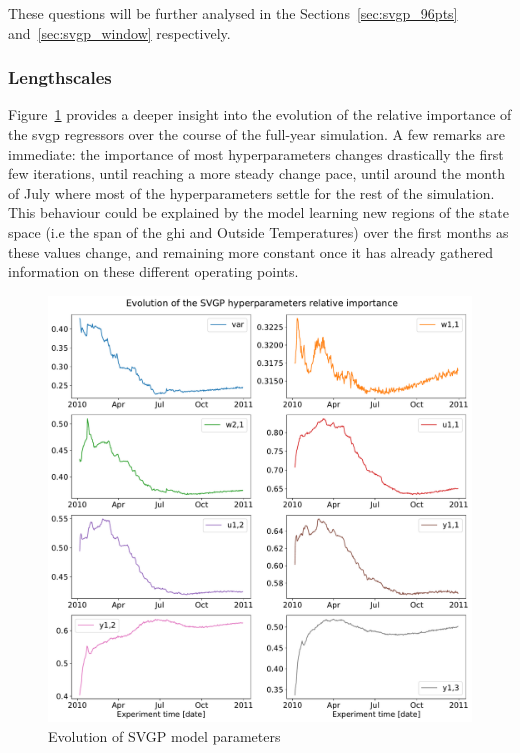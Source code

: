 These questions will be further analysed in the Sections~\ref{sec:svgp_96pts}
and~\ref{sec:svgp_window} respectively.

\clearpage

\subsubsection{Lengthscales}\label{sec:lengthscales_results}

Figure~\ref{fig:SVGP_evol_importance} provides a deeper insight into the
evolution of the relative importance of the \acrshort{svgp} regressors over the
course of the full-year simulation\footnotemark. A few remarks are immediate:
the importance of most hyperparameters changes drastically the first few
iterations, until reaching a more steady change pace, until around the month of
July where most of the hyperparameters settle for the rest of the simulation.
This behaviour could be explained by the model learning new regions of the state
space (i.e the span of the \acrshort{ghi} and Outside Temperatures) over the
first months as these values change, and remaining more constant once it has
already gathered information on these different operating points.


\begin{figure}[ht]
    \centering
    \includegraphics[width =
    \textwidth]{Plots/1_SVGP_480pts_inf_window_12_averageYear_evol_importance.pdf}
    \caption{Evolution of SVGP model parameters}
    \label{fig:SVGP_evol_importance}
\end{figure}


